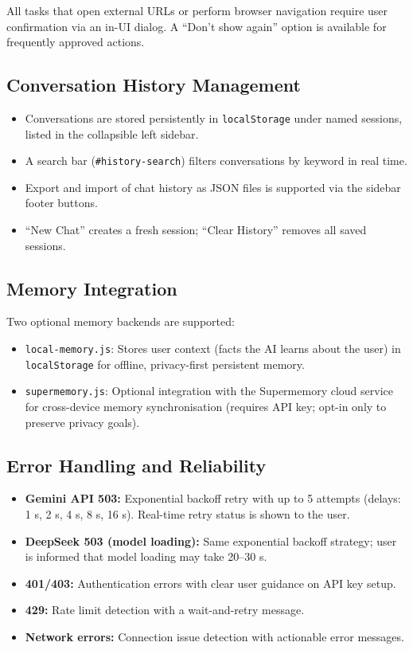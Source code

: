 All tasks that open external URLs or perform browser navigation require user confirmation via an in-UI dialog. A ``Don't show again'' option is available for frequently approved actions.

\subsection{Conversation History Management}
\begin{itemize}[leftmargin=*]
    \item Conversations are stored persistently in \texttt{localStorage} under named sessions, listed in the collapsible left sidebar.
    \item A search bar (\texttt{\#history-search}) filters conversations by keyword in real time.
    \item Export and import of chat history as JSON files is supported via the sidebar footer buttons.
    \item ``New Chat'' creates a fresh session; ``Clear History'' removes all saved sessions.
\end{itemize}

\subsection{Memory Integration}
Two optional memory backends are supported:
\begin{itemize}[leftmargin=*]
    \item \texttt{local-memory.js}: Stores user context (facts the AI learns about the user) in \texttt{localStorage} for offline, privacy-first persistent memory.
    \item \texttt{supermemory.js}: Optional integration with the Supermemory cloud service for cross-device memory synchronisation (requires API key; opt-in only to preserve privacy goals).
\end{itemize}

\subsection{Error Handling and Reliability}
\begin{itemize}[leftmargin=*]
    \item \textbf{Gemini API 503:} Exponential backoff retry with up to 5 attempts (delays: 1 s, 2 s, 4 s, 8 s, 16 s). Real-time retry status is shown to the user.
    \item \textbf{DeepSeek 503 (model loading):} Same exponential backoff strategy; user is informed that model loading may take 20--30 s.
    \item \textbf{401/403:} Authentication errors with clear user guidance on API key setup.
    \item \textbf{429:} Rate limit detection with a wait-and-retry message.
    \item \textbf{Network errors:} Connection issue detection with actionable error messages.
\end{itemize}

